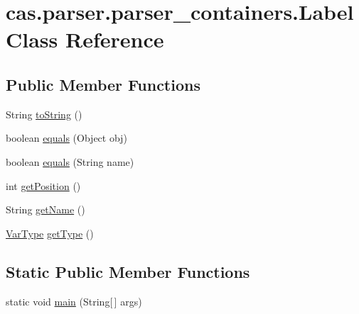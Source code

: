 \hypertarget{classcas_1_1parser_1_1parser__containers_1_1_label}{\section{cas.\-parser.\-parser\-\_\-containers.\-Label Class Reference}
\label{classcas_1_1parser_1_1parser__containers_1_1_label}
}
\subsection*{Public Member Functions}
\begin{DoxyCompactItemize}
\item 
String \hyperlink{classcas_1_1parser_1_1parser__containers_1_1_label_a54539628605d1c00bc33b8fc5ffe3337}{to\-String} ()
\item 
boolean \hyperlink{classcas_1_1parser_1_1parser__containers_1_1_label_a7e3f3cf6e92750bd0f9214565eba586e}{equals} (Object obj)
\item 
boolean \hyperlink{classcas_1_1parser_1_1parser__containers_1_1_label_a979e2bc705e9dc50f16a2cef6b7bc1fb}{equals} (String name)
\item 
int \hyperlink{classcas_1_1parser_1_1parser__containers_1_1_label_a231bfb254204c67918b806ba94134ead}{get\-Position} ()
\item 
String \hyperlink{classcas_1_1parser_1_1parser__containers_1_1_label_ab408647a20b45e5f4d4c9a4fb7a7e578}{get\-Name} ()
\item 
\hyperlink{enumcas_1_1machine_1_1_virtual_machine_1_1_var_type}{Var\-Type} \hyperlink{classcas_1_1parser_1_1parser__containers_1_1_label_a7b6cee4e9aacd024a93844e58ee18f22}{get\-Type} ()
\end{DoxyCompactItemize}
\subsection*{Static Public Member Functions}
\begin{DoxyCompactItemize}
\item 
static void \hyperlink{classcas_1_1parser_1_1parser__containers_1_1_label_a3a8ea18772858f0dc46dc3904ec397a4}{main} (String\mbox{[}$\,$\mbox{]} args)
\end{DoxyCompactItemize}


